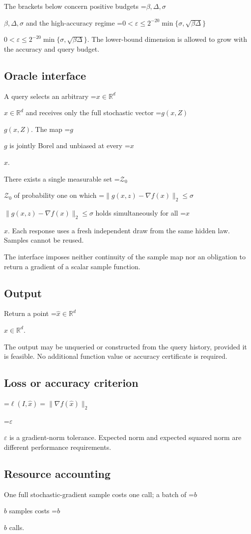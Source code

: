 \documentclass[10pt,a4paper]{article}
\newcommand{\AtlasMath}[1]{\par\begingroup\centering\setbox0=\hbox{$\displaystyle #1$}\ifdim\wd0>1.4\linewidth\typeout{ATLAS WIDE FORMULA: \the\wd0}\fi\ifdim\wd0>\linewidth\resizebox{\linewidth}{!}{\box0}\else\box0\fi\par\endgroup}
\newcommand{\AtlasInlineMath}[1]{\begingroup\setbox0=\hbox{$#1$}\ifdim\wd0>.4\linewidth\endgroup\AtlasMath{#1}\else\endgroup$#1$\fi}
\begin{document}
The brackets below concern positive budgets \AtlasInlineMath{\beta,\Delta,\sigma} and the high-accuracy regime \AtlasInlineMath{0<\varepsilon\le 2^{-20}\min\{\sigma,\sqrt{\beta\Delta}\}}. The lower-bound dimension is allowed to grow with the accuracy and query budget.

\subsection{Oracle interface}
A query selects an arbitrary \AtlasInlineMath{x\in\mathbb R^d} and receives only the full stochastic vector \AtlasInlineMath{g(x,Z)}. The map \AtlasInlineMath{g} is jointly Borel and unbiased at every \AtlasInlineMath{x}.

There exists a single measurable set \AtlasInlineMath{\mathcal Z_0} of probability one on which \AtlasInlineMath{\|g(x,z)-\nabla f(x)\|_2\le\sigma} holds simultaneously for all \AtlasInlineMath{x}. Each response uses a fresh independent draw from the same hidden law. Samples cannot be reused.

The interface imposes neither continuity of the sample map nor an obligation to return a gradient of a scalar sample function.

\subsection{Output}
Return a point \AtlasInlineMath{\widehat x\in\mathbb R^d}.

The output may be unqueried or constructed from the query history, provided it is feasible. No additional function value or accuracy certificate is required.

\subsection{Loss or accuracy criterion}

\AtlasMath{\ell(I,\widehat{x})=\|\nabla f(\widehat{x})\|_2}


\AtlasInlineMath{\varepsilon} is a gradient-norm tolerance. Expected norm and expected squared norm are different performance requirements.

\subsection{Resource accounting}
One full stochastic-gradient sample costs one call; a batch of \AtlasInlineMath{b} samples costs \AtlasInlineMath{b} calls.
\end{document}
